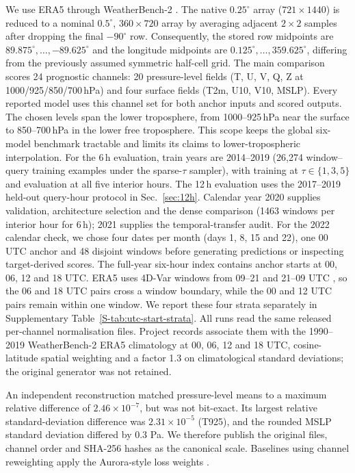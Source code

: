 \documentclass[referee,lineno,pdflatex,sn-nature]{sn-jnl}
\begin{document}
\begin{deferredmethodsrest}
We use ERA5 \cite{hersbach2020era5} through WeatherBench-2
\cite{rasp2024weatherbench}. The native
$0.25^\circ$ array ($721{\times}1440$) is reduced to a nominal
$0.5^\circ$, $360{\times}720$ array by averaging adjacent $2{\times}2$
samples after dropping the final $-90^\circ$ row. Consequently, the stored
row midpoints are $89.875^\circ,\ldots,-89.625^\circ$ and the longitude
midpoints are $0.125^\circ,\ldots,359.625^\circ$, differing from the
previously assumed symmetric half-cell grid. The main comparison scores 24 prognostic channels:
20 pressure-level fields
(T, U, V, Q, Z at 1000/925/850/700\,hPa) and four surface fields
(T2m, U10, V10, MSLP). Every reported model uses this channel set
for both anchor inputs and scored outputs. The chosen levels span the lower
troposphere, from 1000--925\,hPa near the surface to 850--700\,hPa in the lower
free troposphere. This scope keeps the global six-model benchmark tractable
and limits its claims to lower-tropospheric interpolation. For the 6\,h evaluation, train years
are 2014--2019 (26,274 window--query training examples under the
sparse-$\tau$ sampler), with training at $\tau\in\{1,3,5\}$ and evaluation at
all five interior hours. The 12\,h evaluation uses the
2017--2019 held-out query-hour protocol in Sec.~\ref{sec:12h}. Calendar year 2020
supplies validation, architecture selection and the dense comparison (1463
windows per interior hour for 6\,h); 2021 supplies the temporal-transfer audit.
For the 2022 calendar check, we chose four dates per month (days 1, 8, 15 and
22), one 00 UTC anchor and 48 disjoint windows before generating predictions
or inspecting target-derived scores.
The full-year six-hour index contains anchor starts at 00, 06, 12 and 18 UTC.
ERA5 uses 4D-Var windows from 09--21 and 21--09 UTC
\cite{ecmwfera5documentation}, so the 06 and 18 UTC pairs cross a window
boundary, while the 00 and 12 UTC pairs remain within one window. We report these four strata
separately in Supplementary Table~\ref{S-tab:utc-start-strata}.
All runs read the same released per-channel normalisation
files. Project records associate them with the 1990--2019 WeatherBench-2 ERA5
climatology at 00, 06, 12 and 18 UTC, cosine-latitude spatial weighting and a
factor 1.3 on climatological standard deviations; the original generator was
not retained.

An independent reconstruction matched pressure-level means to a maximum
relative difference of $2.46\times10^{-7}$, but was not bit-exact. Its largest
relative standard-deviation difference was $2.31\times10^{-5}$ (T925), and
the rounded MSLP standard deviation differed by 0.3 Pa. We therefore publish
the original files, channel order and SHA-256 hashes as the canonical scale.
Baselines using channel reweighting apply the Aurora-style loss weights
\cite{bodnar2024aurora}.


\end{deferredmethodsrest}
\end{document}
